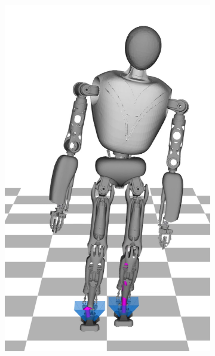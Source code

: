 \begin{figure}
\begin{subfigure}{.16\textwidth}
	\includegraphics[width=.95\linewidth]{fig/walkStatic/snaps/4}
	\caption{}
\end{subfigure}%
\begin{subfigure}{.16\textwidth}

\end{subfigure}
\end{figure}
